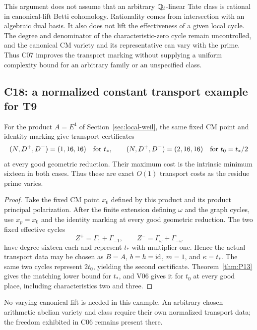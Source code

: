 This argument does not assume that an arbitrary $\mathbb Q_\ell$-linear Tate class is rational in canonical-lift Betti cohomology. Rationality comes from intersection with an algebraic dual basis. It also does not lift the effectiveness of a given local cycle. The degree and denominator of the characteristic-zero cycle remain uncontrolled, and the canonical CM variety and its representative can vary with the prime. Thus C07 improves the transport marking without supplying a uniform complexity bound for an arbitrary family or an unspecified class.

\subsection{C18: a normalized constant transport example for T9}

\begin{proposition}[C18]
\label{prop:T9-constant}
For the product $A=E^4$ of Section~\ref{sec:local-weil}, the same fixed CM point and identity marking give transport certificates
\[
(N,D^+,D^-)=(1,16,16)\quad\hbox{for }t_*,
\qquad (N,D^+,D^-)=(2,16,16)\quad\hbox{for }t_0=t_*/2
\]
at every good geometric reduction. Their maximum cost is the intrinsic minimum sixteen in both cases. Thus these are exact $O(1)$ transport costs as the residue prime varies.
\end{proposition}

\begin{proof}
Take the fixed CM point $x_0$ defined by this product and its product principal polarization. After the finite extension defining $\omega$ and the graph cycles, use $x_p=x_0$ and the identity marking at every good geometric reduction. The two fixed effective cycles
\[
Z^+=\Gamma_1+\Gamma_{-1},\qquad
Z^-=\Gamma_\omega+\Gamma_{-\omega}
\]
have degree sixteen each and represent $t_*$ with multiplier one. Hence the actual transport data may be chosen as $B=A$, $b=h=\operatorname{id}$, $m=1$, and $\kappa=t_*$. The same two cycles represent $2t_0$, yielding the second certificate. Theorem~\ref{thm:P13} gives the matching lower bound for $t_*$, and V06 gives it for $t_0$ at every good place, including characteristics two and three.
\end{proof}

No varying canonical lift is needed in this example. An arbitrary chosen arithmetic abelian variety and class require their own normalized transport data; the freedom exhibited in C06 remains present there.
